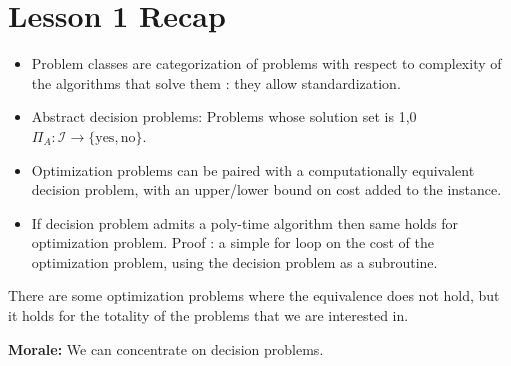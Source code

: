 \section{Lesson 1 Recap}
\begin{itemize}
\item Problem classes are categorization of problems with respect to complexity of the algorithms that solve them : they allow standardization.
\item Abstract decision problems: Problems whose solution set is {1,0} $\Pi_A:\mathcal I\longrightarrow\{\mathrm{yes},\mathrm{no}\}$.
\item Optimization problems can be paired with a computationally equivalent decision problem, with an upper/lower bound on cost added to the instance.
\item If decision problem admits a poly-time algorithm then same holds for optimization problem. Proof : a simple for loop on the cost of the optimization problem, using the decision problem as a subroutine.
\end{itemize}
There are some optimization problems where the equivalence does not hold, but it holds for the totality of the problems that we are interested in.

\textbf{Morale:} We can concentrate on decision problems.
